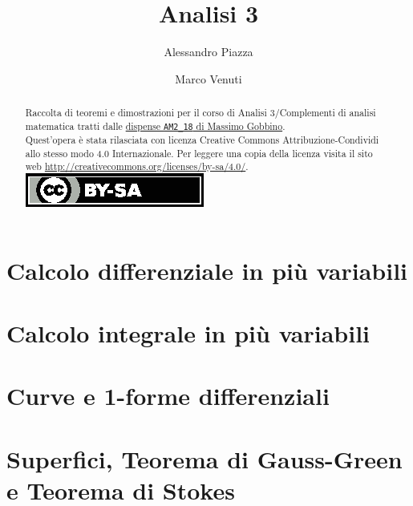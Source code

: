 \documentclass[a4paper]{article}
\title{Analisi 3}
\author{Alessandro Piazza \and Marco Venuti}
\begin{document}
\maketitle

\begin{abstract}
        Raccolta di teoremi e dimostrazioni per il corso di Analisi 3/Complementi di analisi matematica tratti dalle \href{http://pagine.dm.unipi.it/gobbino/Home_Page/ArchivioDidattico.html}{dispense \texttt{AM2\_18} di Massimo Gobbino}. \\

        Quest'opera è stata rilasciata con licenza Creative Commons Attribuzione-Condividi allo stesso modo 4.0 Internazionale. Per leggere una copia della licenza visita il sito web \url{http://creativecommons.org/licenses/by-sa/4.0/}.
        \href{http://creativecommons.org/licenses/by-sa/4.0/}{\includegraphics[scale=0.8]{by-sa}}
\end{abstract}

\tableofcontents

\clearpage

\section{Calcolo differenziale in più variabili}

\clearpage

\section{Calcolo integrale in più variabili}

\clearpage

\section{Curve e 1-forme differenziali}

\clearpage

\section{Superfici, Teorema di Gauss-Green e Teorema di Stokes}

\clearpage
\end{document}
